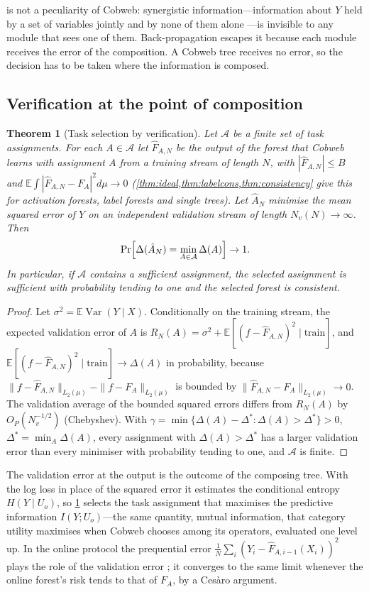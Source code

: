 \documentclass[11pt]{article}
\newtheorem{theorem}{Theorem}
\theoremstyle{definition}
\theoremstyle{remark}
\newcommand{\E}{\mathbb{E}}
\newcommand{\cA}{\mathcal{A}}
\newcommand{\Var}{\operatorname{Var}}
\begin{document}
 is not a peculiarity of Cobweb: synergistic information---information
about $Y$ held by a set of variables jointly and by none of them alone
\citep{williams2010}---is invisible to any module that sees one of them.  Back-propagation
escapes it because each module receives the error of the composition.  A Cobweb tree
receives no error, so the decision has to be taken where the information is composed.

\subsection{Verification at the point of composition}

\begin{theorem}[Task selection by verification]\label{thm:selection}
Let $\cA$ be a finite set of task assignments.  For each $A\in\cA$ let $\hat F_{A,N}$ be
the output of the forest that Cobweb learns with assignment $A$ from a training stream
of length $N$, with $|\hat F_{A,N}|\le B$ and $\E\int|\hat F_{A,N}-F_A|^2d\mu\to0$
(\cref{thm:ideal,thm:labelcons,thm:consistency} give this for activation forests, label
forests and single trees).  Let $\hat A_N$ minimise the mean squared error of $Y$ on an
independent validation stream of length $N_v(N)\to\infty$.  Then
\[
  \Pr\Bigl[\Delta(\hat A_N)=\min_{A\in\cA}\Delta(A)\Bigr]\to1.
\]
In particular, if $\cA$ contains a sufficient assignment, the selected assignment is
sufficient with probability tending to one and the selected forest is consistent.
\end{theorem}
\begin{proof}
Let $\sigma^2=\E\Var(Y\mid X)$.  Conditionally on the training stream, the expected
validation error of $A$ is
$R_N(A)=\sigma^2+\E[(f-\hat F_{A,N})^2\mid\text{train}]$, and
$\E[(f-\hat F_{A,N})^2\mid\text{train}]\to\Delta(A)$ in probability, because
$\|f-\hat F_{A,N}\|_{L_2(\mu)}-\|f-F_A\|_{L_2(\mu)}$ is bounded by
$\|\hat F_{A,N}-F_A\|_{L_2(\mu)}\to0$.  The validation average of the bounded squared
errors differs from $R_N(A)$ by $O_P(N_v^{-1/2})$ (Chebyshev).  With
$\gamma=\min\{\Delta(A)-\Delta^*:\Delta(A)>\Delta^*\}>0$, $\Delta^*=\min_A\Delta(A)$,
every assignment with $\Delta(A)>\Delta^*$ has a larger validation error than every
minimiser with probability tending to one, and $\cA$ is finite.
\end{proof}

The validation error at the output is the outcome of the composing tree.  With the log
loss in place of the squared error it estimates the conditional entropy
$H(Y\mid U_o)$, so \cref{thm:selection} selects the task assignment that maximises the
predictive information $I(Y;U_o)$---the same quantity, mutual information, that category
utility maximises when Cobweb chooses among its operators, evaluated one level up.  In
the online protocol the prequential error $\frac1N\sum_i(Y_i-\hat F_{A,i-1}(X_i))^2$
plays the role of the validation error \citep{dawid1984}; it converges to the same limit
whenever the online forest's risk tends to that of $F_A$, by a Ces\`aro argument.
\end{document}
